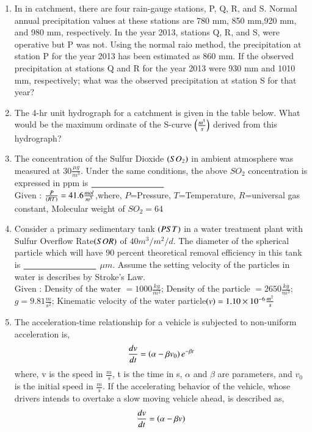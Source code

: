 \documentclass[journal,12pt,onecolumn]{IEEEtran}
\theoremstyle{remark}
\begin{document}
\begin{enumerate}
\begin{enumerate}
\end{enumerate}

\item In in catchment, there are four rain-gauge stations, P, Q, R, and S. Normal annual precipitation values at these stations are 780 mm, 850 mm,920 mm, and 980 mm, respectively. In the year 2013, stations Q, R, and S, were operative but P was not. Using the normal raio method, the precipitation at station P for the year 2013 has been estimated as 860 mm. If the observed precipitation at stations Q and R for the year 2013 were 930 mm and 1010 mm, respectively; what was the observed precipitation  at station S for that year?

\item The 4-hr unit hydrograph for a catchment is given in the table below. What would be the maximum ordinate of the S-curve $\left(\frac{m^3}{s}\right)$ derived from this hydrograph?
\begin{table}[h!]    
\centering

\end{table}
\item The concentration of the Sulfur Dioxide $\left(SO_2\right)$ in ambient atmosphere was measured at $ 30 \frac{\mu g}{m^3}$. Under the same conditions, the above $SO_2$ concentration is expressed in ppm is  $\makebox[3cm][l]{\underline{\hspace{3cm}}}$\\
Given : $\frac{P}{\left(RT\right)}=41.6\frac{mol}{m^3}$,where, $P$=Pressure, $T$=Temperature, $R$=universal gas constant,  Molecular weight of $SO_2=64$
\item Consider a primary sedimentary tank $\left(PST\right)$ in a water treatment plant with  Sulfur Overflow Rate$\left(SOR\right)$ of $40m^3/m^2/d.$ The diameter of the spherical particle which will have 90 percent theoretical removal efficiency in this tank is $\makebox[3cm][l]{\underline{\hspace{3cm}}}$ $\mu m$. Assume the setting velocity of the particles in water is describes by Stroke's Law.\\
Given : Density of the water $= 1000 \frac{kg}{m^3}$; Density of the particle $=2650 \frac{kg}{m^3}$;$g=9.81 \frac{m}{s^2}$; Kinematic velocity of the water particle$\left(v\right)=1.10 \times 10^{-6} \frac{m^2}{s}$
\item The acceleration-time relationship for a vehicle is subjected to non-uniform acceleration is, $$\frac{dv}{dt}=\left(\alpha - \beta v_0\right) e^{-\beta t}$$ where, v is the speed in $\frac{m}{s}$, t is the time in s, $\alpha$ and $\beta$ are parameters, and $v_0$ is the initial speed in $\frac{m}{s}$. If the accelerating behavior of the vehicle, whose drivers intends to overtake a slow moving vehicle ahead, is described as, $$\frac{dv}{dt} = \left(\alpha - {\beta}v\right)$$


\end{enumerate}
\end{document}
